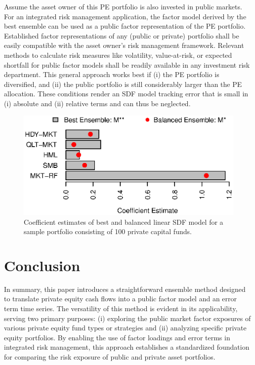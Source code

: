 \documentclass[12pt]{article}
\begin{document}
Assume the asset owner of this PE portfolio is also invested in public markets.
For an integrated risk management application, the factor model derived by the best ensemble can be used as a public factor representation of the PE portfolio.
Established factor representations of any (public or private) portfolio shall be easily compatible with the asset owner's risk management framework.
Relevant methods to calculate risk measures like volatility, value-at-risk, or expected shortfall for public factor models shall be readily available in any investment risk department. 
This general approach works best if (i) the PE portfolio is diversified, and (ii) the public portfolio is still considerably larger than the PE allocation.
These conditions render an SDF model tracking error that is small in (i) absolute and (ii) relative terms and can thus be neglected.

\begin{figure}[H]
	\centering
	\includegraphics{Figures/Coefs100Pofo}
	\caption{Coefficient estimates of best and balanced linear SDF model for a sample portfolio consisting of 100 private capital funds.}
	\label{fig:coef_barchart_100_pofo}
\end{figure}

\fi


\section{Conclusion}
\label{sec:conclusion}

In summary, this paper introduces a straightforward ensemble method designed to translate private equity cash flows into a public factor model and an error term time series. 
The versatility of this method is evident in its applicability, serving two primary purposes: 
(i) exploring the public market factor exposures of various private equity fund types or strategies and (ii) analyzing specific private equity portfolios. 
By enabling the use of factor loadings and error terms in integrated risk management, this approach establishes a standardized foundation for comparing the risk exposure of public and private asset portfolios.
\end{document}
